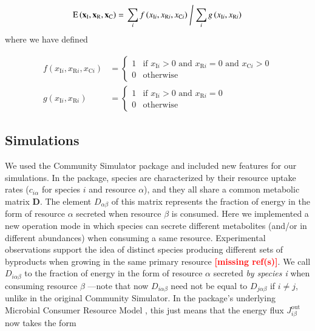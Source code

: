 \documentclass[a4paper,10pt]{article}
\newcommand{\mr}{\textcolor{red}{\textbf{[missing ref(s)]}}}
\begin{document}
\begin{equation}
\mathrm{E} \left( \mathbf{x}_\mathrm{I},
\mathbf{x}_\mathrm{R},
\mathbf{x}_\mathrm{C} \right) = 
\left.
\sum_i
f \left( x_{\mathrm{I}i}, x_{\mathrm{R}i}, x_{\mathrm{C}i} \right)
\;
\middle/
\;
\sum_i
g \left( x_{\mathrm{I}i}, x_{\mathrm{R}i} \right)
\right.
\label{eq:endemic}
\end{equation}
%
where we have defined

\begin{equation}
\begin{split}
f \left( x_{\mathrm{I}i}, x_{\mathrm{R}i}, x_{\mathrm{C}i} \right) & =
\begin{cases}
    1 & \text{if } x_{\mathrm{I}i} > 0 \text{ and }
                   x_{\mathrm{R}i} = 0 \text{ and }
                   x_{\mathrm{C}i} > 0 \\
    0 & \text{otherwise}
\end{cases} \\
g \left( x_{\mathrm{I}i}, x_{\mathrm{R}i} \right) & =
\begin{cases}
    1 & \text{if } x_{\mathrm{I}i} > 0 \text{ and }
                   x_{\mathrm{R}i} = 0 \\
    0 & \text{otherwise}
\end{cases}
\end{split}
\label{eq:endemic-f}
\end{equation}

\subsection*{Simulations}\label{methods:sim}

We used the Community Simulator package \cite{Marsland2020} and included new
features for our simulations. In the package,
species are characterized by their resource uptake rates ($c_{i\alpha}$ for
species $i$ and resource $\alpha$), and they all
share a common metabolic matrix $\mathbf{D}$.
The element $D_{\alpha\beta}$
of this matrix represents the fraction of energy in the form of resource $\alpha$
secreted when resource $\beta$ is consumed.
Here we implemented a new operation mode
in which species can secrete different metabolites (and/or
in different abundances) when consuming a same resource. Experimental observations
support the idea of distinct species producing different sets of byproducts when
growing in the same primary resource \mr. We call $D_{i\alpha\beta}$ to the
fraction of energy in the form of resource $\alpha$ secreted \textit{by species
i} when consuming resource $\beta$ ---note that now $D_{i\alpha\beta}$ need not be
equal to $D_{j\alpha\beta}$ if $i \neq j$, unlike in the original Community
Simulator. In the package's underlying Microbial Consumer Resource Model
\cite{Goldford2018,Marsland2019}, this just means that the energy flux
$J^{\mathrm{out}}_{i\beta}$ now takes the form
\end{document}
